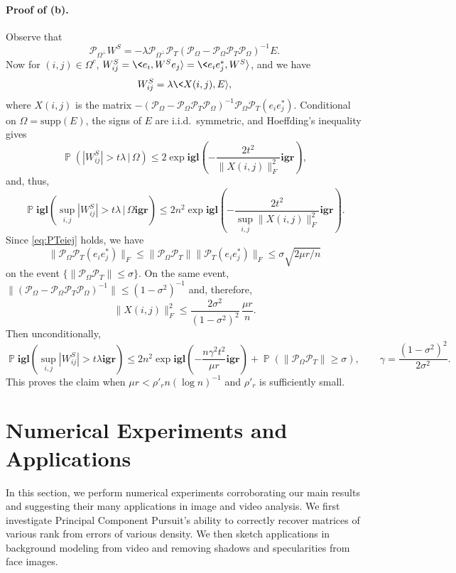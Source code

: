 \paragraph{Proof of (b).} Observe that 
\[
\mathcal{P}_{\Omega^\perp} W^S  = -\lambda \mathcal{P}_{\Omega^\perp} \mathcal{P}_T (\mathcal{P}_{\Omega} - \mathcal{P}_{\Omega} \mathcal{P}_T \mathcal{P}_{\Omega})^{-1} E.
\]
Now for $(i,j) \in \Omega^c$, $W^S_{ij} = \<e_i, W^S e_j\rangle = \<e_i
e_j^*, W^S\rangle$, and we have 
\[
W^S_{ij} = \lambda \<X(i,j), E\rangle, 
\]
where $X(i,j)$ is the matrix $-(\mathcal{P}_{\Omega} - \mathcal{P}_{\Omega} \mathcal{P}_T \mathcal{P}_{\Omega})^{-1} \mathcal{P}_{\Omega}
\mathcal{P}_T(e_ie_j^*)$.  Conditional on $\Omega = \text{supp}(E)$, the signs of $E$ are i.i.d.~symmetric, and Hoeffding's inequality gives
\[
\operatorname{\mathbb{P}}( |W^S_{ij}| > t \lambda \, | \, \Omega) \le 2
\exp\mathbf{igl}(-\frac{2t^2}{ \|X(i,j)\|_F^2}\mathbf{igr}), 
\]
and, thus,
\[
\operatorname{\mathbb{P}}\mathbf{igl}(\sup_{i,j} |W^S_{ij}| > t \lambda \, | \, \Omega\mathbf{igr}) \le 2n^2
\exp\mathbf{igl}(-\frac{2t^2}{\sup_{i,j} \|X(i,j)\|_F^2}\mathbf{igr}).
\] 
Since \eqref{eq:PTeiej} holds, we have
\[
\|\mathcal{P}_{\Omega} \mathcal{P}_T(e_ie_j^*)\|_F \le \|\mathcal{P}_{\Omega} \mathcal{P}_T\| \|\mathcal{P}_T(e_ie_j^*)\|_F \le \sigma
\sqrt{2\mu r/n}
\]
on the event $\{\|\mathcal{P}_{\Omega}\mathcal{P}_T\| \le \sigma\}$.  On the same event, $\|(\mathcal{P}_{\Omega} -
\mathcal{P}_{\Omega} \mathcal{P}_T \mathcal{P}_{\Omega})^{-1}\| \le (1-\sigma^2)^{-1}$ and, therefore, 
\[
\|X(i,j)\|^2_F \le \frac{2\sigma^2}{(1-\sigma^2)^2} \, \frac{\mu r}{n}.
\]
Then unconditionally,
\[
\operatorname{\mathbb{P}}\mathbf{igl}(\sup_{i,j} |W^S_{ij}| > t \lambda\mathbf{igr}) \le 2n^2
\exp\mathbf{igl}(-\frac{n \gamma^2 t^2}{\mu r}\mathbf{igr})+ \operatorname{\mathbb{P}}(\|\mathcal{P}_{\Omega}\mathcal{P}_T\| \ge \sigma), \qquad \gamma = \frac{(1-\sigma^2)^2}{2\sigma^2}.
\]
This proves the claim when $\mu r < \rho'_r n (\log n)^{-1}$ and
$\rho'_r$ is sufficiently small.

\section{Numerical Experiments and
  Applications}\label{sec:experiments}

In this section, we perform numerical experiments corroborating our main results and suggesting their many applications in image and video analysis. We first investigate Principal Component Pursuit's ability to correctly recover matrices of various rank from errors of various density. We then sketch applications in background modeling from video and removing shadows and specularities from face images. 

